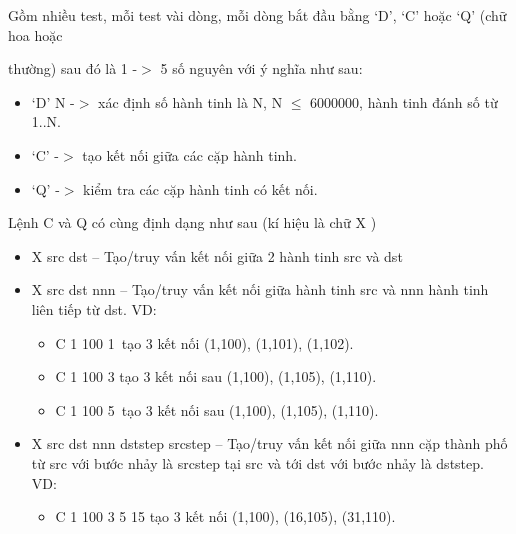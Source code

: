 Gồm nhiều test, mỗi test vài dòng, mỗi dòng bắt đầu bằng ‘D’, ‘C’ hoặc ‘Q’ (chữ hoa hoặc

thường) sau đó là 1 -$>$ 5 số nguyên với ý nghĩa như sau:
\begin{itemize}
	\item ‘D’ N -$>$ xác định số hành tinh là N, N $\le$ 6000000, hành tinh đánh số từ 1..N.
	\item ‘C’ -$>$ tạo kết nối giữa các cặp hành tinh.
	\item ‘Q’ -$>$ kiểm tra các cặp hành tinh có kết nối.
\end{itemize}

Lệnh C và Q có cùng định dạng như sau (kí hiệu là chữ X )
\begin{itemize}
	\item X src dst – Tạo/truy vấn kết nối giữa 2 hành tinh src và dst
	\item X src dst nnn – Tạo/truy vấn kết nối giữa hành tinh src và nnn hành tinh liên tiếp từ dst. VD:
\begin{itemize}
	\item C 1 100 1 tạo 3 kết nối (1,100), (1,101), (1,102).
	\item C 1 100 3 tạo 3 kết nối sau (1,100), (1,105), (1,110).
	\item C 1 100 5 tạo 3 kết nối sau (1,100), (1,105), (1,110).
\end{itemize}
	\item X src dst nnn dststep srcstep – Tạo/truy vấn kết nối giữa nnn cặp thành phố từ src với bước nhảy là srcstep tại src và tới dst với bước nhảy là dststep. VD:
\begin{itemize}
	\item C 1 100 3 5 15 tạo 3 kết nối (1,100), (16,105), (31,110).
\end{itemize}
\end{itemize}